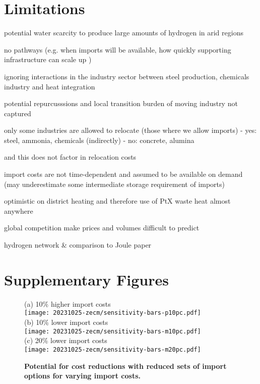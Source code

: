 
\section*{Limitations}

potential water scarcity to produce large amounts of hydrogen in arid regions

no pathways (e.g. when imports will be available, how quickly supporting infrastructure can scale up )

ignoring interactions in the industry sector between steel production, chemicals industry and heat integration

potential repurcusssions and local transition burden of moving industry not captured

only some industries are allowed to relocate (those where we allow imports)
- yes: steel, ammonia, chemicals (indirectly)
- no: concrete, alumina

and this does not factor in relocation costs

import costs are not time-dependent and assumed to be available on demand (may underestimate some intermediate storage requirement of imports)

optimistic on district heating and therefore use of PtX waste heat almost anywhere

global competition make prices and volumes difficult to predict

hydrogen network \& comparison to Joule paper
\newpage
\section*{Supplementary Figures}
\begin{figure}[!htb]
    \footnotesize
    (a) 10\% higher import costs \\
    \texttt{[image: 20231025-zecm/sensitivity-bars-p10pc.pdf]} \\
    (b) 10\% lower import costs \\
    \texttt{[image: 20231025-zecm/sensitivity-bars-m10pc.pdf]} \\
    (c) 20\% lower import costs \\
    \texttt{[image: 20231025-zecm/sensitivity-bars-m20pc.pdf]} \\
    \caption{\textbf{Potential for cost reductions with reduced sets of import options for varying import costs.}}
    \label{fig:si:subsets}
\end{figure}

